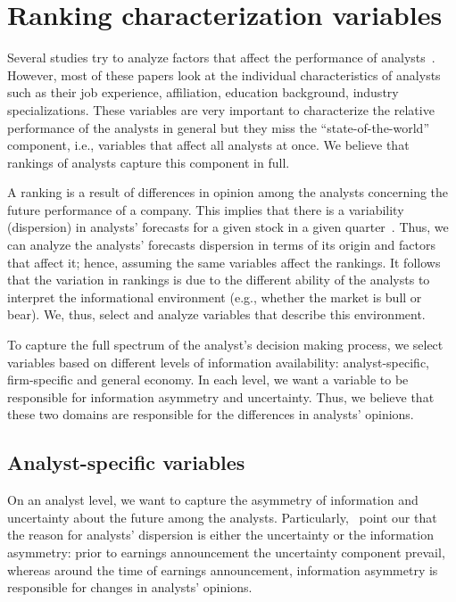 \documentclass[a4paper,12pt,openright,notitlepage]{report}\usepackage[]{graphicx}\usepackage[]{color}
\begin{document}
\section{Ranking characterization variables}
\label{ch3-sec:ind.var}
Several studies try to analyze  factors that affect the performance of analysts~\citep{clement1999,brown2003,jegadeesh2004}.  However, most of these papers look at the individual characteristics of analysts such as their job experience, affiliation,  education background, industry specializations. These variables are very important to characterize the relative performance of the analysts in general but they miss the ``state-of-the-world'' component, i.e., variables that affect all analysts at once. We believe that rankings of analysts capture this component in full.

A ranking is a result of  differences in opinion among the analysts concerning the future performance of a company.  This implies that there is  a variability (dispersion) in analysts' forecasts for a given stock in a given quarter~\citep{diether2002}. Thus, we can analyze  the analysts' forecasts dispersion in terms of its origin and factors that affect it; hence, assuming the same variables affect the rankings. It follows that the variation in rankings is due to the different ability of the analysts to interpret the informational environment (e.g., whether the market is bull or bear). We, thus, select and analyze variables that describe this environment.

To capture the full spectrum of the analyst's decision making process, we select  variables based on different levels of information availability: analyst-specific,  firm-specific  and general economy. In each level, we want a variable to be responsible for information asymmetry and uncertainty. Thus, we believe that these two domains are responsible for the differences in analysts' opinions.

\subsection{Analyst-specific variables}
On an analyst level, we want to capture the asymmetry of information  and uncertainty about the future among the analysts. Particularly,~\cite{barron2009} point our that the reason for analysts' dispersion is either the uncertainty or the information asymmetry: prior to earnings announcement the uncertainty component prevail, whereas around the time of earnings announcement, information asymmetry is responsible for changes in analysts' opinions.
\end{document}
